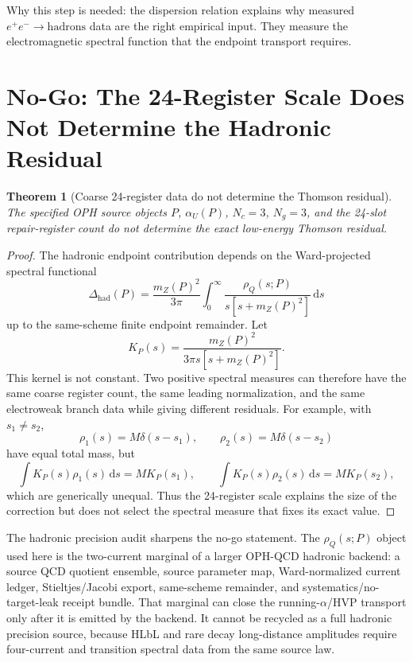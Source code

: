 \documentclass[11pt]{article}
\newtheorem{theorem}{Theorem}
\theoremstyle{remark}
\newcommand{\dd}{\,\mathrm d}
\begin{document}
Why this step is needed: the dispersion relation explains why measured \(e^+e^-\to\mathrm{hadrons}\) data are the right empirical input. They measure the electromagnetic spectral function that the endpoint transport requires.

\section{No-Go: The 24-Register Scale Does Not Determine the Hadronic Residual}

\begin{theorem}[Coarse 24-register data do not determine the Thomson residual]
The specified OPH source objects \(P\), \(\alpha_U(P)\), \(N_c=3\), \(N_g=3\), and the
24-slot repair-register count do not determine the exact low-energy Thomson residual.
\end{theorem}

\begin{proof}
The hadronic endpoint contribution depends on the Ward-projected spectral functional
\begin{equation}
\Delta_{\mathrm{had}}(P)
=
\frac{m_Z(P)^2}{3\pi}
\int_0^\infty
\frac{\rho_Q(s;P)}{s[s+m_Z(P)^2]}\dd s
\label{eq:hadronkernelnogo}
\end{equation}
up to the same-scheme finite endpoint remainder. Let
\[
K_P(s)=\frac{m_Z(P)^2}{3\pi s[s+m_Z(P)^2]}.
\]
This kernel is not constant. Two positive spectral measures can therefore have the same coarse
register count, the same leading normalization, and the same electroweak branch data while giving
different residuals. For example, with \(s_1\ne s_2\),
\[
\rho_1(s)=M\delta(s-s_1),
\qquad
\rho_2(s)=M\delta(s-s_2)
\]
have equal total mass, but
\[
\int K_P(s)\rho_1(s)\dd s=M K_P(s_1),
\qquad
\int K_P(s)\rho_2(s)\dd s=M K_P(s_2),
\]
which are generically unequal. Thus the 24-register scale explains the size of the correction but
does not select the spectral measure that fixes its exact value.
\end{proof}

The hadronic precision audit sharpens the no-go statement. The
\(\rho_Q(s;P)\) object used here is the two-current marginal of a larger OPH-QCD
hadronic backend: a source QCD quotient ensemble, source parameter map, Ward-normalized current
ledger, Stieltjes/Jacobi export, same-scheme remainder, and systematics/no-target-leak receipt
bundle. That marginal can close the running-\(\alpha\)/HVP transport only after it is emitted by
the backend. It cannot be recycled as a full hadronic precision source, because HLbL and rare
decay long-distance amplitudes require four-current and transition spectral data from the same
source law.
\end{document}
